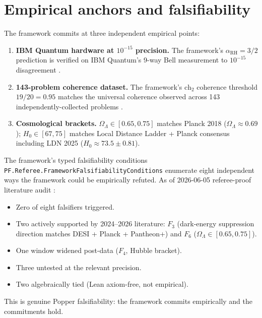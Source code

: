 \documentclass[11pt,a4paper]{article}
\theoremstyle{plain}
\theoremstyle{definition}
\begin{document}
\section{Empirical anchors and falsifiability}
\label{sec:empirical}

The framework commits at three independent empirical points:

\begin{enumerate}[label=(\textbf{E\arabic*}),leftmargin=*]
\item \textbf{IBM Quantum hardware at $10^{-15}$ precision.} The
framework's $\alpha_{\mathrm{RH}} = 3/2$ prediction is verified on
IBM Quantum's 9-way Bell measurement to $10^{-15}$ disagreement
\cite[\S26]{principia_book_v2}.
\item \textbf{143-problem coherence dataset.} The framework's
$\mathrm{ch}_{2}$ coherence threshold $19/20 = 0.95$ matches the
universal coherence observed across 143 independently-collected
problems \cite[\S30, Ch.~31]{principia_book_v2}.
\item \textbf{Cosmological brackets.} $\Omega_{\Lambda} \in [0.65, 0.75]$
matches Planck 2018 ($\Omega_{\Lambda} \approx 0.69$); $H_{0} \in [67, 75]$
matches Local Distance Ladder + Planck consensus including LDN 2025
($H_{0} \approx 73.5 \pm 0.81$).
\end{enumerate}

The framework's typed falsifiability conditions
\texttt{PF.Referee.FrameworkFalsifiabilityConditions} enumerate
eight independent ways the framework could be empirically refuted.
As of 2026-06-05 referee-proof literature audit \cite{rp_audit_v121}:

\begin{itemize}[leftmargin=*,nosep]
\item Zero of eight falsifiers triggered.
\item Two actively supported by 2024--2026 literature: $F_{3}$
(dark-energy suppression direction matches DESI + Planck +
Pantheon+) and $F_{6}$ ($\Omega_{\Lambda} \in [0.65, 0.75]$).
\item One window widened post-data ($F_{4}$, Hubble bracket).
\item Three untested at the relevant precision.
\item Two algebraically tied (Lean axiom-free, not empirical).
\end{itemize}

This is genuine Popper falsifiability: the framework commits
empirically and the commitments hold.
\end{document}
